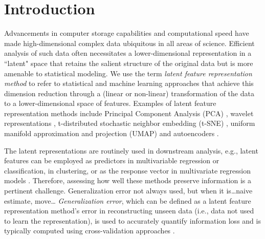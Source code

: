 \section{Introduction}

Advancements in computer storage capabilities and computational speed have made high-dimensional complex data ubiquitous in all areas of science.
Efficient analysis of such data often necessitates a lower-dimensional representation in a ``latent" space that retains the salient structure of the original data but is more amenable to statistical modeling.
We use the term \emph{latent feature representation method} to refer to statistical and machine learning approaches that achieve this dimension reduction through a (linear or non-linear) transformation of the data to a lower-dimensional space of features.
Examples of latent feature representation methods include Principal Component Analysis (PCA) \parencite{hotelling_analysis_1933}, wavelet representations \parencite{daubechies_wavelet_1990}, t-distributed stochastic neighbor embedding (t-SNE) \parencite{maaten_visualizing_2008}, uniform manifold approximation and projection (UMAP) \parencite{mcinnes_umap_2020} and autoencoders \parencite{rumelhart_learning_1986}.

The latent representations are routinely used in downstream analysis, e.g., latent features can be employed as predictors in multivariable regression or classification, in clustering, or as the response vector in multivariate regression models \parencite{niu_dimensionality_2011,wang_role_2014, cook_fisher_2007}. 
Therefore, assessing how well these methods preserve information is a pertinent challenge.
{\color{purple}Generalization error not always used, but when it is\dots naive estimate, move\dots}
\emph{Generalization error}, which can be defined as a latent feature representation method's error in reconstructing unseen data (i.e., data not used to learn the representation), is used to accurately quantify information loss and is typically computed using cross-validation approaches \parencite[see, e.g.,][]{becht_dimensionality_2019, bro_cross-validation_2008, wold_cross-validatory_1978, eastment_cross-validatory_1982,krzanowski_cross-validation_1987, minka_automatic_2000, rajan_bayesian_1994, camacho_cross-validation_2014, diana_cross-validation_2002, hubert_fast_2007, josse_selecting_2012, saccenti_use_2015}.

